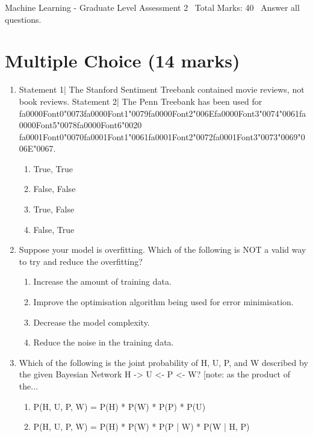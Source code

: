 \documentclass[12pt]{article}
\begin{document}
\begin{center}
Machine Learning - Graduate Level Assessment 2 \
Total Marks: 40 \
Answer all questions.
\end{center}

\section*{Multiple Choice (14 marks)}
\begin{enumerate}[label=\arabic*.]
\item Statement 1| The Stanford Sentiment Treebank contained movie reviews, not book reviews. Statement 2| The Penn Treebank has been used for {\csname fa0000Font0\endcsname\char"0073}{\csname fa0000Font1\endcsname\char"0079}{\csname fa0000Font2\endcsname\char"006E}{\csname fa0000Font3\endcsname\char"0074}{\char"0061}{\csname fa0000Font5\endcsname\char"0078}{\csname fa0000Font6\endcsname\char"0020} {\csname fa0001Font0\endcsname\char"0070}{\csname fa0001Font1\endcsname\char"0061}{\csname fa0001Font2\endcsname\char"0072}{\csname fa0001Font3\endcsname\char"0073}{\char"0069}{\char"006E}{\char"0067}.
\begin{enumerate}[label=(\alph*)]
    \item True, True
    \item False, False
    \item True, False
    \item False, True
\end{enumerate}
\item Suppose your model is overfitting. Which of the following is NOT a valid way to try and reduce the overfitting?
\begin{enumerate}[label=(\alph*)]
    \item Increase the amount of training data.
    \item Improve the optimisation algorithm being used for error minimisation.
    \item Decrease the model complexity.
    \item Reduce the noise in the training data.
\end{enumerate}
\item Which of the following is the joint probability of H, U, P, and W described by the given Bayesian Network H -> U <- P <- W? [note: as the product of the...
\begin{enumerate}[label=(\alph*)]
    \item P(H, U, P, W) = P(H) * P(W) * P(P) * P(U)
    \item P(H, U, P, W) = P(H) * P(W) * P(P | W) * P(W | H, P)

\end{enumerate}
\end{enumerate}
\end{document}

